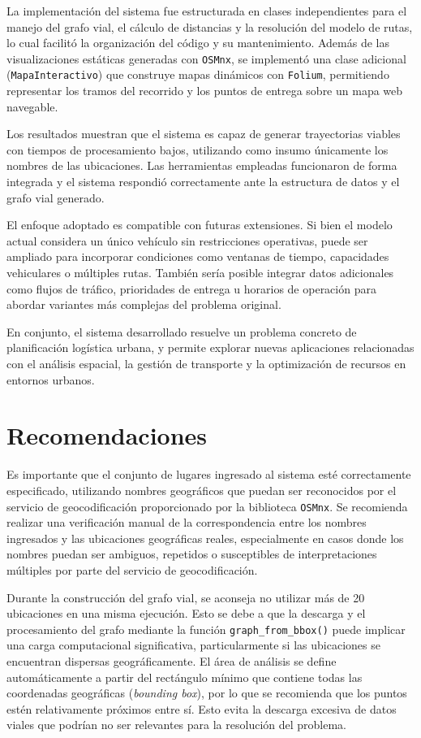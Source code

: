 \documentclass[a4paper,12pt]{article}
\begin{document}
La implementación del sistema fue estructurada en clases independientes para el manejo del grafo vial, el cálculo de distancias y la resolución del modelo de rutas, lo cual facilitó la organización del código y su mantenimiento. Además de las visualizaciones estáticas generadas con \texttt{OSMnx}, se implementó una clase adicional (\texttt{MapaInteractivo}) que construye mapas dinámicos con \texttt{Folium}, permitiendo representar los tramos del recorrido y los puntos de entrega sobre un mapa web navegable.

Los resultados muestran que el sistema es capaz de generar trayectorias viables con tiempos de procesamiento bajos, utilizando como insumo únicamente los nombres de las ubicaciones. Las herramientas empleadas funcionaron de forma integrada y el sistema respondió correctamente ante la estructura de datos y el grafo vial generado.

El enfoque adoptado es compatible con futuras extensiones. Si bien el modelo actual considera un único vehículo sin restricciones operativas, puede ser ampliado para incorporar condiciones como ventanas de tiempo, capacidades vehiculares o múltiples rutas. También sería posible integrar datos adicionales como flujos de tráfico, prioridades de entrega u horarios de operación para abordar variantes más complejas del problema original.

En conjunto, el sistema desarrollado resuelve un problema concreto de planificación logística urbana, y permite explorar nuevas aplicaciones relacionadas con el análisis espacial, la gestión de transporte y la optimización de recursos en entornos urbanos.


\newpage
\section{Recomendaciones}

Es importante que el conjunto de lugares ingresado al sistema esté correctamente especificado, utilizando nombres geográficos que puedan ser reconocidos por el servicio de geocodificación proporcionado por la biblioteca \texttt{OSMnx}. Se recomienda realizar una verificación manual de la correspondencia entre los nombres ingresados y las ubicaciones geográficas reales, especialmente en casos donde los nombres puedan ser ambiguos, repetidos o susceptibles de interpretaciones múltiples por parte del servicio de geocodificación.

Durante la construcción del grafo vial, se aconseja no utilizar más de 20 ubicaciones en una misma ejecución. Esto se debe a que la descarga y el procesamiento del grafo mediante la función \texttt{graph\_from\_bbox()} puede implicar una carga computacional significativa, particularmente si las ubicaciones se encuentran dispersas geográficamente. El área de análisis se define automáticamente a partir del rectángulo mínimo que contiene todas las coordenadas geográficas (\textit{bounding box}), por lo que se recomienda que los puntos estén relativamente próximos entre sí. Esto evita la descarga excesiva de datos viales que podrían no ser relevantes para la resolución del problema.
\end{document}
